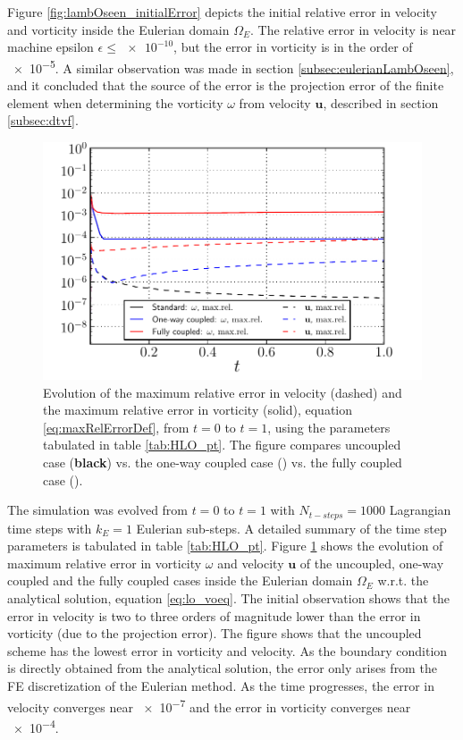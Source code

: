 Figure \ref{fig:lambOseen_initialError} depicts the initial relative error in velocity and vorticity inside the Eulerian domain $\Omega_E$. The relative error in velocity is near machine epsilon $\epsilon \le \num{e-10}$, but the error in vorticity is in the order of \num{e-5}. A similar observation was made in section \ref{subsec:eulerianLambOseen}, and it concluded that the source of the error is the projection error of the finite element when determining the vorticity $\omega$ from velocity $\mathbf{u}$, described in section \ref{subsec:dtvf}. 

	\begin{figure}[!b]
	\centering
	\includegraphics[width=0.6\linewidth]{./figures/hybrid/lambOseen/lambOseen_comparision_compressed.pdf}
	\caption{Evolution of the maximum relative error in velocity (dashed) and the maximum relative error in vorticity (solid), equation \ref{eq:maxRelErrorDef}, from $t=0$ to $t=1$, using the parameters tabulated in table \ref{tab:HLO_pt}. The figure compares uncoupled case (\textbf{black}) vs. the one-way coupled case ({}) vs. the fully coupled case ({}).}
	\label{fig:lambOseen_comparison}
	\end{figure}

The simulation was evolved from $t=0$ to $t=1$ with $N_{t-steps} = 1000$ Lagrangian time steps with $k_E=1$ Eulerian sub-steps. A detailed summary of the time step parameters is tabulated in table \ref{tab:HLO_pt}. Figure \ref{fig:lambOseen_comparison} shows the evolution of maximum relative error in vorticity $\omega$ and velocity $\mathbf{u}$ of the uncoupled, one-way coupled and the fully coupled cases inside the Eulerian domain $\Omega_E$ w.r.t. the analytical solution, equation \ref{eq:lo_voeq}. The initial observation shows that the error in velocity is two to three orders of magnitude lower than the error in vorticity (due to the projection error). The figure shows that the uncoupled scheme has the lowest error in vorticity and velocity. As the boundary condition is directly obtained from the analytical solution, the error only arises from the FE discretization of the Eulerian method. As the time progresses, the error in velocity converges near \num{e-7} and the error in vorticity converges near \num{e-4}.

